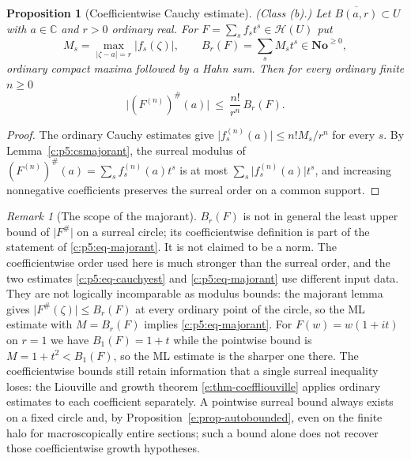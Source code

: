 \documentclass[11pt,a4paper]{article}
\numberwithin{equation}{section}
\newtheorem{proposition}[theorem]{Proposition}
\theoremstyle{definition}
\theoremstyle{remark}
\newtheorem{remark}[theorem]{Remark}
\theoremstyle{plain}
\newcommand{\No}{\mathbf{No}}
\newcommand{\CC}{\mathbb C}
\newcommand{\tm}{t}
\newcommand{\ev}[1]{#1^{\#}}
\newcommand{\Hc}{\mathcal H}
\newcommand{\abs}[1]{\lvert #1\rvert}
\begin{document}
\begin{proposition}[Coefficientwise Cauchy estimate]
\label{c:p5:majorant}
\emph{(Class (b).)} Let $\overline{B(a,r)}\subset U$ with $a\in\CC$ and
$r>0$ ordinary real. For $F=\sum_sf_s\tm^{s}\in\Hc(U)$ put
\[
 M_s=\max_{\abs{\zeta-a}=r}\abs{f_s(\zeta)},
 \qquad
 B_r(F)=\sum_sM_s\tm^{s}\in\No^{\ge0},
\]
ordinary compact maxima followed by a Hahn sum. Then for every ordinary
finite $n\ge0$
\begin{equation}\label{c:p5:eq-majorant}
 \bigl|\ev{(F^{(n)})}(a)\bigr|\ \le\ \frac{n!}{r^{n}}\,B_r(F).
\end{equation}
\end{proposition}

\begin{proof}
The ordinary Cauchy estimates give
$\abs{f_s^{(n)}(a)}\le n!M_s/r^{n}$ for every $s$. By
Lemma~\ref{c:p5:csmajorant}, the surreal modulus of
$\ev{(F^{(n)})}(a)=\sum_sf_s^{(n)}(a)\tm^{s}$ is at most
$\sum_s\abs{f_s^{(n)}(a)}\tm^{s}$, and increasing nonnegative
coefficients preserves the surreal order on a common support.
\end{proof}

\begin{remark}[The scope of the majorant]\label{c:p5:rk-majorant}
$B_r(F)$ is not in general the least upper bound of $\abs{\ev F}$ on a
surreal circle; its coefficientwise definition is part of the statement
of \eqref{c:p5:eq-majorant}. It is not claimed to be a norm. The
coefficientwise order used here is much stronger than the surreal order,
and the two estimates \eqref{c:p5:eq-cauchyest} and
\eqref{c:p5:eq-majorant} use different input data. They are not
logically incomparable as modulus bounds: the majorant lemma gives
$\abs{\ev F(\zeta)}\le B_r(F)$ at every ordinary point of the circle,
so the ML estimate with $M=B_r(F)$ implies
\eqref{c:p5:eq-majorant}. For
$F(w)=w(1+i\tm)$ on $r=1$ we have $B_1(F)=1+\tm$ while the pointwise
bound is $M=1+\tm^{2}<B_1(F)$, so the ML estimate is the sharper one
there. The coefficientwise bounds still retain information that a
single surreal inequality loses: the Liouville and growth theorem
\ref{e:thm-coeffliouville} applies ordinary estimates to each coefficient
separately. A pointwise surreal bound always exists on a fixed circle
and, by Proposition~\ref{e:prop-autobounded}, even on the finite halo
for macroscopically entire sections; such a bound alone does not recover
those coefficientwise growth hypotheses.
\end{remark}
\end{document}
